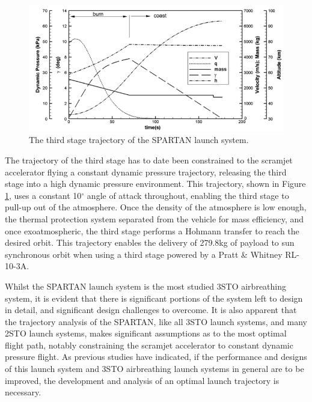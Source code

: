  
 \begin{figure}[ht]
 	\centering
 	\includegraphics[width=0.9\linewidth]{figures/2_literature-review/SPARTAN_trajthirdstage}
 	\caption{The third stage trajectory of the SPARTAN launch system\cite{Preller2018a}.}
 	\label{fig:SPARTAN_trajthirdstage}
 \end{figure}

The trajectory of the third stage has to date been constrained to the scramjet accelerator flying a constant dynamic pressure trajectory, releasing the third stage into a high dynamic pressure environment. This trajectory, shown in Figure \ref{fig:SPARTAN_trajthirdstage}, uses a constant 10$^\circ$ angle of attack throughout, enabling the third stage to pull-up out of the atmosphere.  
 Once the density of the atmosphere is low enough, the thermal protection system separated from the vehicle for mass efficiency, and once exoatmospheric, the third stage performs a Hohmann transfer to reach the desired orbit. 
This trajectory enables the delivery of 279.8kg\cite{Preller2018a} of payload to sun synchronous orbit when using a third stage powered by a Pratt \& Whitney RL-10-3A\cite{Preller2018a}. 

Whilst the SPARTAN launch system is the most studied 3STO airbreathing system, it is evident that there is significant portions of the system left to design in detail, and significant design challenges to overcome. It is also apparent that the trajectory analysis of the SPARTAN, like all 3STO launch systems, and many 2STO launch systems, makes significant assumptions as to the most optimal flight path, notably constraining the scramjet accelerator to constant dynamic pressure flight. 
As previous studies have indicated\cite{Preller2017b}, if the performance and designs of this launch system and 3STO airbreathing launch systems in general are to be improved, the development and analysis of an optimal launch trajectory is necessary.



